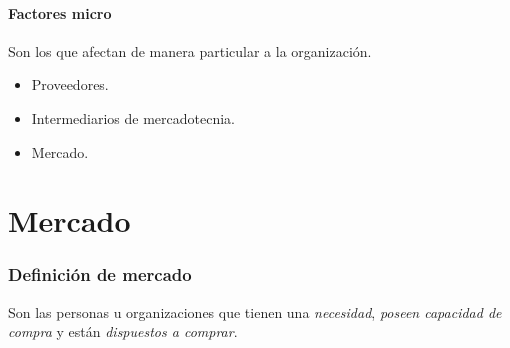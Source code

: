 \documentclass[12pt, spanish, a5paper]{article}
\begin{document}
\subsection{Factores micro}

Son los que afectan de manera particular a la organización.

\begin{itemize}
	\item Proveedores.
	\item Intermediarios de mercadotecnia.
	\item Mercado.
\end{itemize}


\part{Mercado}


\section{Definición de mercado}
Son las personas u organizaciones que tienen una \emph{necesidad}, \emph{poseen capacidad de compra} y están \emph{dispuestos a comprar}.
\end{document}
